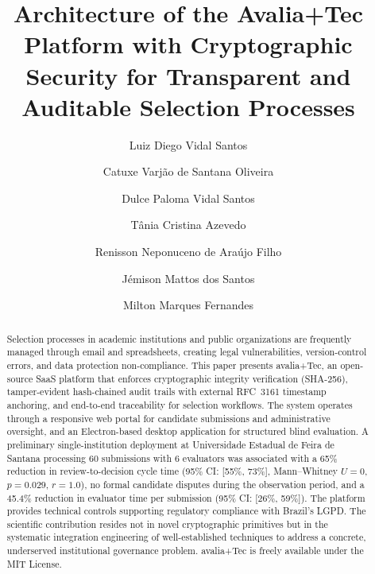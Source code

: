 \documentclass[preprint,12pt,a4paper]{elsarticle}
\begin{document}
\renewcommand{\labelenumii}{\arabic{enumi}.\arabic{enumii}}

\begin{frontmatter}

\title{Architecture of the Avalia+Tec Platform with Cryptographic Security for Transparent and Auditable Selection Processes}

\author[label1]{Luiz Diego Vidal Santos}
\author[label2]{Catuxe Varjão de Santana Oliveira}
\author[label4]{Dulce Paloma Vidal Santos}
\author[label1]{Tânia Cristina Azevedo}
\author[label3]{Renisson Neponuceno de Araújo Filho}
\author[label5]{Jémison Mattos dos Santos}
\author[label6]{Milton Marques Fernandes}

\address[label1]{Universidade Estadual de Feira de Santana, Departamento de Ciências Exatas, Feira de Santana, Brasil}
\address[label2]{Universidade Federal de Sergipe, Programa de Pós-Graduação em Ciência da Propriedade Intelectual, São Cristóvão, Brasil}
\address[label3]{Universidade Federal Rural de Pernambuco, Departamento de Engenharia Rural, Recife, Brasil}
\address[label4]{Universidade Tiradentes, Departamento de Direito, Aracaju, Brasil}
\address[label5]{Universidade Estadual de Santa Cruz, Ilhéus, Brasil}
\address[label6]{Universidade Federal de Sergipe, Departamento de Ciências Florestais, São Cristóvão, Brasil}


\begin{abstract}
Selection processes in academic institutions and public organizations are frequently managed through email and spreadsheets, creating legal vulnerabilities, version-control errors, and data protection non-compliance. This paper presents avalia+Tec, an open-source SaaS platform that enforces cryptographic integrity verification (SHA-256), tamper-evident hash-chained audit trails with external RFC~3161 timestamp anchoring, and end-to-end traceability for selection workflows. The system operates through a responsive web portal for candidate submissions and administrative oversight, and an Electron-based desktop application for structured blind evaluation. A preliminary single-institution deployment at Universidade Estadual de Feira de Santana processing 60 submissions with 6 evaluators was associated with a 65\% reduction in review-to-decision cycle time (95\% CI: [55\%, 73\%], Mann--Whitney $U = 0$, $p = 0.029$, $r = 1.0$), no formal candidate disputes during the observation period, and a 45.4\% reduction in evaluator time per submission (95\% CI: [26\%, 59\%]). The platform provides technical controls supporting regulatory compliance with Brazil's LGPD. The scientific contribution resides not in novel cryptographic primitives but in the systematic integration engineering of well-established techniques to address a concrete, underserved institutional governance problem. avalia+Tec is freely available under the MIT License.
\end{abstract}


\end{frontmatter}
\end{document}
